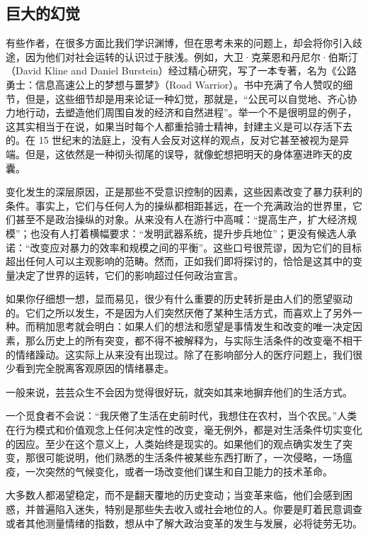 \subsection{巨大的幻觉}
有些作者，在很多方面比我们学识渊博，但在思考未来的问题上，却会将你引入歧途，因为他们对社会运转的认识过于肤浅。例如，大卫·克莱恩和丹尼尔·伯斯汀（David Kline and Daniel Burstein）经过精心研究，写了一本专著，名为《公路勇士：信息高速公上的梦想与噩梦》（Road Warrior）。书中充满了令人赞叹的细节，但是，这些细节却是用来论证一种幻觉，那就是，“公民可以自觉地、齐心协力地行动，去塑造他们周围自发的经济和自然进程”。举一个不是很明显的例子，这其实相当于在说，如果当时每个人都重拾骑士精神，封建主义是可以存活下去的。在 15 世纪末的法庭上，没有人会反对这样的观点，反对它甚至被视为是异端。但是，这依然是一种彻头彻尾的误导，就像蛇想把明天的身体塞进昨天的皮囊。

变化发生的深层原因，正是那些不受意识控制的因素，这些因素改变了暴力获利的条件。事实上，它们与任何人为的操纵都相距甚远，在一个充满政治的世界里，它们甚至不是政治操纵的对象。从来没有人在游行中高喊：“提高生产，扩大经济规模”；也没有人打着横幅要求：“发明武器系统，提升步兵地位”；更没有候选人承诺：“改变应对暴力的效率和规模之间的平衡”。这些口号很荒谬，因为它们的目标超出任何人可以主观影响的范畴。然而，正如我们即将探讨的，恰恰是这其中的变量决定了世界的运转，它们的影响超过任何政治宣言。

如果你仔细想一想，显而易见，很少有什么重要的历史转折是由人们的愿望驱动的。它们之所以发生，不是因为人们突然厌倦了某种生活方式，而喜欢上了另外一种。而稍加思考就会明白：如果人们的想法和愿望是事情发生和改变的唯一决定因素，那么历史上的所有突变，都不得不被解释为，与实际生活条件的改变毫不相干的情绪躁动。这实际上从来没有出现过。除了在影响部分人的医疗问题上，我们很少看到完全脱离客观原因的情绪暴走。

一般来说，芸芸众生不会因为觉得很好玩，就突如其来地摒弃他们的生活方式。

一个觅食者不会说：“我厌倦了生活在史前时代，我想住在农村，当个农民。”人类在行为模式和价值观念上任何决定性的改变，毫无例外，都是对生活条件切实变化的因应。至少在这个意义上，人类始终是现实的。如果他们的观点确实发生了突变，那很可能说明，他们熟悉的生活条件被某些东西打断了，一次侵略，一场瘟疫，一次突然的气候变化，或者一场改变他们谋生和自卫能力的技术革命。

大多数人都渴望稳定，而不是翻天覆地的历史变动；当变革来临，他们会感到困惑，并普遍陷入迷失，特别是那些失去收入或社会地位的人。你要是盯着民意调查或者其他测量情绪的指数，想从中了解大政治变革的发生与发展，必将徒劳无功。

